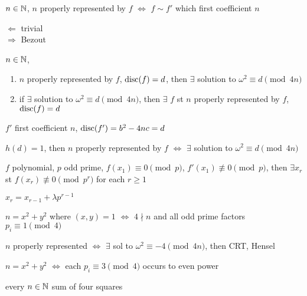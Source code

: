 \begin{lemma}
    $n \in \mathbb{N}$, $n$ properly represented by $f$ $\iff$ $f \sim f'$ which first coefficient $n$
\end{lemma}
\begin{pf}
    $\Leftarrow$ trivial\\
    $\Rightarrow$ Bezout
\end{pf}

\begin{thm}
    $n \in \mathbb{N}$,
    \begin{enumerate}
        \item $n$ properly represented by $f$, $\textnormal{disc}(f) = d$, then $\exists$ solution to $\omega^{2} \equiv d \pmod{4n}$
        \item if $\exists$ solution to $\omega^{2} \equiv d \pmod{4n}$, then $\exists$ $f$ st $n$ properly represented by $f$, $\textnormal{disc}(f) = d$
    \end{enumerate}
\end{thm}
\begin{pf}
    $f'$ first coefficient $n$, $\textnormal{disc}(f') = b^2 - 4nc = d$
\end{pf}

\begin{fact}
    $h(d) = 1$, then $n$ properly represented by $f$ $\iff$ $\exists$ solution to $\omega^{2} \equiv d \pmod{4n}$
\end{fact}

\begin{prop}
    $f$ polynomial, $p$ odd prime, $f(x_1) \equiv 0 \pmod{p}$, $f'(x_1) \not\equiv 0 \pmod{p}$, then $\exists x_r$ st $f(x_r) \not \equiv 0 \pmod{p^r}$ for each $r \geq 1$
\end{prop}
\begin{pf}
    $x_r = x_{r-1} + \lambda p^{r-1}$
\end{pf}

\begin{thm}
    $n = x^2 + y^2$ where $(x, y) = 1$ $\iff$ $4 \nmid n$ and all odd prime factors $p_i \equiv 1 \pmod{4}$
\end{thm}
\begin{pf}
    $n$ properly represented $\iff$ $\exists$ sol to $\omega^2 \equiv -4 \pmod{4n}$, then CRT, Hensel
\end{pf}

\begin{cor}
    $n = x^2 + y^2$ $\iff$ each $p_i \equiv 3 \pmod{4}$ occurs to even power
\end{cor}

\begin{thm}[Langrange]
    every $n \in \mathbb{N}$ sum of four squares
\end{thm}
